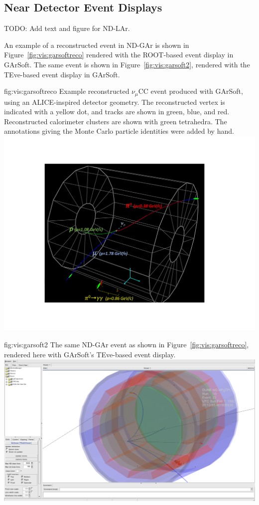 \documentclass[../main-v1.tex]{subfiles}
\begin{document}
\subsection{Near Detector Event Displays}
\label{sec:visualization:neardetector}

TODO:  {\color{red}Add text and figure for ND-LAr.}

An example of a reconstructed event in ND-GAr is shown in Figure~\ref{fig:vis:garsoftreco} rendered with the ROOT-based event display in GArSoft.  The same event is shown in Figure~\ref{fig:vis:garsoft2}, rendered with the TEve-based event display in GArSoft.

\begin{dunefigure}
{fig:vis:garsoftreco} 
{Example reconstructed $\nu_\mu$CC event produced with GArSoft, using an ALICE-inspired detector geometry.  The reconstructed vertex is indicated with a yellow dot, and tracks are shown in green, blue, and red.  Reconstructed calorimeter clusters are shown with green tetrahedra.  The annotations giving the Monte Carlo particle identities were added by hand.}
\includegraphics[width=0.9 \textwidth]{graphics/EventDisplays/nd_gar_evdwp2_withcaloclusters.pdf}
\end{dunefigure}

\begin{dunefigure}
{fig:vis:garsoft2} 
{The same ND-GAr event as shown in Figure~\ref{fig:vis:garsoftreco}, rendered here with GArSoft's TEve-based event display.}
\includegraphics[width=0.9 \textwidth]{graphics/EventDisplays/ndgar_evd3d.png}
\end{dunefigure}
\end{document}
